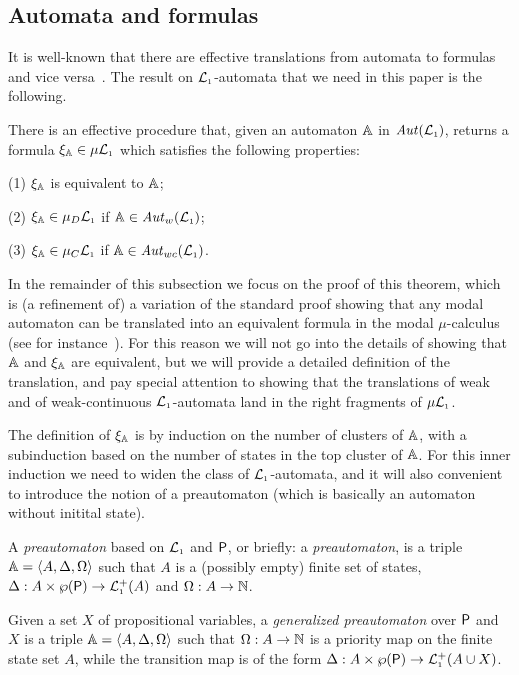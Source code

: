 \subsection{Automata and formulas}

\newcommand{\ytr}{\mathtt{tr}}

It is well-known that there are effective translations from automata to formulas
and vice versa~\cite{xxxx}.
The result on $\mathcal{L}_{\scriptscriptstyle 1}$-automata that we need in this paper is the following.

\begin{theorem}\label{t:autofor}
There is an effective procedure that, given an automaton $\mathbb{A}$ in 
$\mathit{Aut}(\mathcal{L}_{\scriptscriptstyle 1})$, returns a formula $\xi_{\mathbb{A}} \in \mu\mathcal{L}_{\scriptscriptstyle 1}$ which satisfies
the following properties:

(1) $\xi_{\mathbb{A}}$ is equivalent to $\mathbb{A}$;

(2) $\xi_{\mathbb{A}} \in \mu_{D}\mathcal{L}_{\scriptscriptstyle 1}$ if $\mathbb{A} \in \mathit{Aut}_{w}(\mathcal{L}_{\scriptscriptstyle 1})$;

(3) $\xi_{\mathbb{A}} \in \mu_{C}\mathcal{L}_{\scriptscriptstyle 1}$ if $\mathbb{A} \in \mathit{Aut}_{wc}(\mathcal{L}_{\scriptscriptstyle 1})$.
\end{theorem}

In the remainder of this subsection
we focus on the proof of this theorem, which is (a refinement of)
a variation of the standard proof showing that any modal automaton can be 
translated into an equivalent formula in the modal $\mu$-calculus (see for
instance~\cite[Section 6]{Ven08}). 
For this reason we will not go into the details of showing that $\mathbb{A}$ and 
$\xi_{\mathbb{A}}$ are equivalent, but we will provide a detailed definition of the 
translation, and pay special attention to showing that the translations of weak
and of weak-continuous $\mathcal{L}_{\scriptscriptstyle 1}$-automata land in the right fragments of 
$\mu\mathcal{L}_{\scriptscriptstyle 1}$. 

The definition of $\xi_{\mathbb{A}}$ is by induction on the number of clusters of
$\mathbb{A}$, with a subinduction based on the number of states in the top cluster 
of $\mathbb{A}$.
For this inner induction we need to widen the class of $\mathcal{L}_{\scriptscriptstyle 1}$-automata, and
it will also convenient to introduce the notion of a preautomaton (which is  
basically an automaton without initital state).

\begin{definition}
A \emph{preautomaton} based on $\mathcal{L}_{\scriptscriptstyle 1}$ and $\mathsf{P}$, or briefly: a
\emph{preautomaton}, is a triple $\mathbb{A} = \langle{A,\Delta,\Omega}\rangle$ such that $A$ is
a (possibly empty) finite set of states, $\Delta: A\times \wp(\mathsf{P}) \to 
\mathcal{L}_{\scriptscriptstyle 1}^+(A)$ and $\Omega: A \to \mathbb{N}$.

Given a set $X$ of propositional variables, a \emph{generalized preautomaton} 
over $\mathsf{P}$ and $X$ is a triple $\mathbb{A} = \langle{A,\Delta,\Omega}\rangle$ such that $\Omega:
A \to \mathbb{N}$ is a priority map on the finite state set $A$, while the transition 
map is of the form $\Delta: A\times \wp(\mathsf{P}) \to \mathcal{L}_{\scriptscriptstyle 1}^+(A\cup X)$.
\end{definition}

